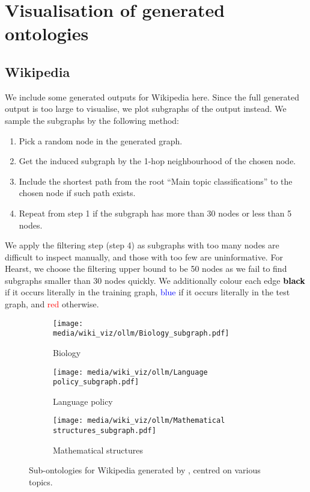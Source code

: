 \newpage

\chapter{Visualisation of generated ontologies} \label{appendix:visualisation}

\section{Wikipedia} \label{appendix:viz-wiki}

We include some generated outputs for Wikipedia here. Since the full generated output is too large to visualise, we plot subgraphs of the output instead. We sample the subgraphs by the following method:
\begin{enumerate}
    \item Pick a random node in the generated graph.
    \item Get the induced subgraph by the 1-hop neighbourhood of the chosen node.
    \item Include the shortest path from the root ``Main topic classifications'' to the chosen node if such path exists.
    \item Repeat from step 1 if the subgraph has more than 30 nodes or less than 5 nodes.
\end{enumerate}
We apply the filtering step (step 4) as subgraphs with too many nodes are difficult to inspect manually, and those with too few are uninformative. For Hearst, we choose the filtering upper bound to be 50 nodes as we fail to find subgraphs smaller than 30 nodes quickly. We additionally colour each edge \textcolor{black}{\textbf{black}} if it occurs literally in the training graph, \textcolor{blue}{blue} if it occurs literally in the test graph, and \textcolor{red}{red} otherwise.

\newpage
\begin{figure}[H]
    \centering
    \begin{subfigure}{0.9\textwidth}
        \centering
        \texttt{[image: media/wiki\_viz/ollm/Biology\_subgraph.pdf]}
        \caption{Biology}
    \end{subfigure}
    \begin{subfigure}{0.9\textwidth}
        \centering
        \texttt{[image: media/wiki\_viz/ollm/Language policy\_subgraph.pdf]}
        \caption{Language policy}
    \end{subfigure}
    \begin{subfigure}{0.9\textwidth}
        \centering
        \texttt{[image: media/wiki\_viz/ollm/Mathematical structures\_subgraph.pdf]}
        \caption{Mathematical structures}
        \label{fig:ollm-wiki-samples-math}
    \end{subfigure}
    \caption{Sub-ontologies for Wikipedia generated by \name, centred on various topics.}
\end{figure}

